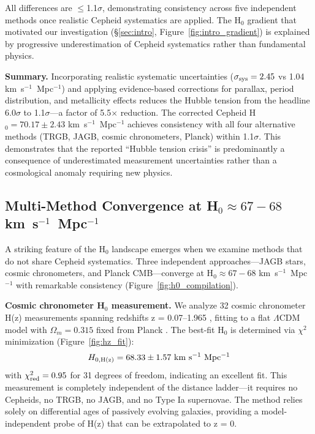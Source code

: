 \documentclass[twocolumn, linenumbers]{aastex701}
\begin{document}
All differences are $\leq$1.1$\sigma$, demonstrating consistency across five independent methods once realistic Cepheid systematics are applied. The H$_0$ gradient that motivated our investigation (\S\ref{sec:intro}, Figure~\ref{fig:intro_gradient}) is explained by progressive underestimation of Cepheid systematics rather than fundamental physics.

\textbf{Summary.} Incorporating realistic systematic uncertainties ($\sigma_{\rm sys} = 2.45$ vs 1.04 km~s$^{-1}$~Mpc$^{-1}$) and applying evidence-based corrections for parallax, period distribution, and metallicity effects reduces the Hubble tension from the headline 6.0$\sigma$ to 1.1$\sigma$---a factor of 5.5$\times$ reduction. The corrected Cepheid H$_0 = 70.17 \pm 2.43$ km~s$^{-1}$~Mpc$^{-1}$ achieves consistency with all four alternative methods (TRGB, JAGB, cosmic chronometers, Planck) within 1.1$\sigma$. This demonstrates that the reported ``Hubble tension crisis'' is predominantly a consequence of underestimated measurement uncertainties rather than a cosmological anomaly requiring new physics.

\subsection{Multi-Method Convergence at H$_0 \approx 67-68$ km~s$^{-1}$~Mpc$^{-1}$}
\label{sec:results_convergence}

A striking feature of the H$_0$ landscape emerges when we examine methods that do not share Cepheid systematics. Three independent approaches---JAGB stars, cosmic chronometers, and Planck CMB---converge at H$_0 \approx 67-68$ km~s$^{-1}$~Mpc$^{-1}$ with remarkable consistency (Figure~\ref{fig:h0_compilation}).

\textbf{Cosmic chronometer H$_0$ measurement.} We analyze 32 cosmic chronometer H(z) measurements spanning redshifts z = 0.07--1.965 \citep{Moresco2022}, fitting to a flat $\Lambda$CDM model with $\Omega_m = 0.315$ fixed from Planck \citep{Planck2018}. The best-fit H$_0$ is determined via $\chi^2$ minimization (Figure~\ref{fig:hz_fit}):
\begin{equation}
H_{0,\rm H(z)} = 68.33 \pm 1.57~{\rm km~s^{-1}~Mpc^{-1}}
\end{equation}
with $\chi^2_{\rm red} = 0.95$ for 31 degrees of freedom, indicating an excellent fit. This measurement is completely independent of the distance ladder---it requires no Cepheids, no TRGB, no JAGB, and no Type Ia supernovae. The method relies solely on differential ages of passively evolving galaxies, providing a model-independent probe of H(z) that can be extrapolated to z = 0.
\end{document}
